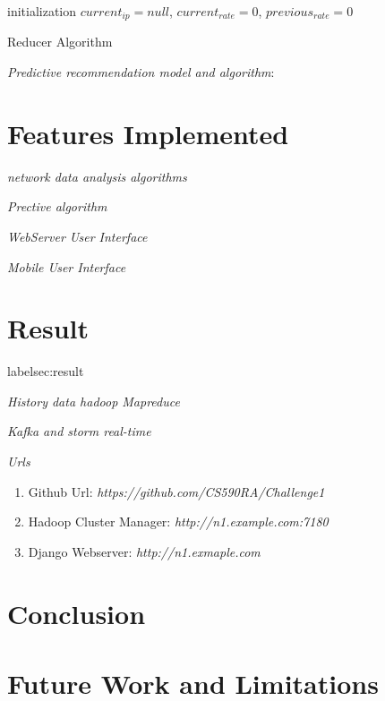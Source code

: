 \documentclass[conference]{IEEEtran}
\begin{document}
\IncMargin{1em}
\LinesNumbered
\begin{algorithm}[!ht]

	initialization  $current_{ip}=null$, $current_{rate}=0$, $previous_{rate}=0$ \;
    	
    \caption{Reducer Algorithm}
    \label{mapper_algorithm}
\end{algorithm}
\DecMargin{1em}


\emph{Predictive recommendation model and algorithm}:


\section{Features Implemented}
\emph{network data analysis algorithms}

\emph{Prective algorithm}

\emph{WebServer User Interface}

\emph{Mobile User Interface}


\section{Result} label{sec:result}

\emph{History data hadoop Mapreduce}


\emph{Kafka and storm real-time}

\emph{Urls}

\begin{enumerate}
	\item Github Url: \emph{https://github.com/CS590RA/Challenge1}
	\item Hadoop Cluster Manager: \emph{http://n1.example.com:7180}
	\item Django Webserver: \emph{http://n1.exmaple.com}
	

\end{enumerate}

\section{Conclusion}\label{sec:conc}

\section{Future Work and Limitations}





\end{document}
